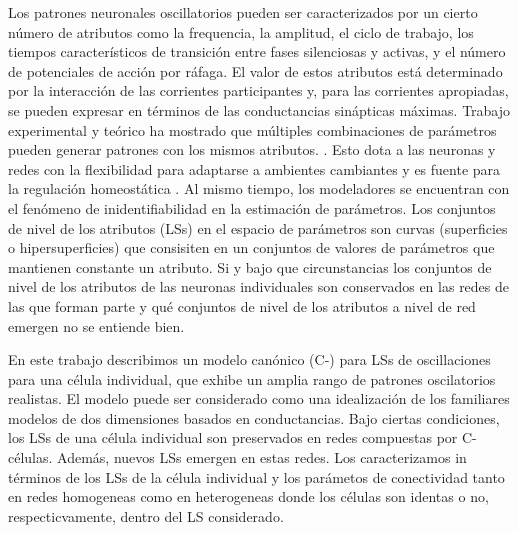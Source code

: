 %
\label{sec:abstract2}

Los patrones neuronales oscillatorios pueden ser caracterizados por un cierto número de atributos como la frequencia, la amplitud, el ciclo de trabajo, los tiempos característicos de transición entre fases silenciosas y activas, y el número de potenciales de acción por ráfaga. El valor de estos atributos está determinado por la interacción de las corrientes participantes y, para las corrientes apropiadas, se pueden expresar en términos de las conductancias sinápticas máximas. Trabajo experimental y teórico ha mostrado que múltiples combinaciones de parámetros pueden generar patrones con los mismos atributos. \cite{Prinz,Rot,Oly,Olypher2010}. Esto dota a las neuronas y redes con la flexibilidad para adaptarse a ambientes cambiantes y es fuente para la regulación homeostática \cite{Olypher2010}. Al mismo tiempo, los modeladores se encuentran con el fenómeno de inidentifiabilidad en la estimación de parámetros. Los conjuntos de nivel de los atributos (LSs) en el espacio de parámetros son curvas (superficies o hipersuperficies) que consisiten en un conjuntos de valores de parámetros que mantienen constante un atributo. Si y bajo que circunstancias los conjuntos de nivel de los atributos de las neuronas individuales son conservados en las redes de las que forman parte y qué conjuntos de nivel de los atributos a nivel de red emergen no se entiende bien.

En este trabajo describimos un modelo canónico (C-) para LSs de oscillaciones para una célula individual, que exhibe un amplia rango de patrones oscilatorios realistas. El modelo puede ser considerado como una idealización de los familiares modelos de dos dimensiones basados en conductancias. Bajo ciertas condiciones, los LSs de una célula individual son preservados en redes compuestas por C-células. Además, nuevos LSs emergen en estas redes. Los caracterizamos in términos de los LSs de la célula individual y los parámetos de conectividad tanto en redes homogeneas como en heterogeneas donde los células son identas o no, respecticvamente, dentro del LS considerado.
\vspace*{20mm}